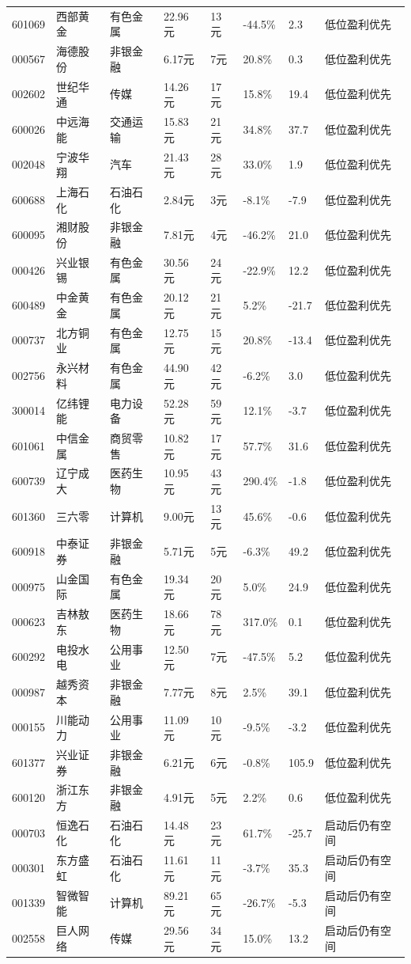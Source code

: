 \begin{longtable}{L{1.05cm}L{1.55cm}L{1.55cm}R{0.85cm}R{0.85cm}R{0.85cm}R{0.85cm}L{2.25cm}}
601069 & 西部黄金 & 有色金属 & 22.96元 & 13元 & -44.5\% & 2.3 & 低位盈利优先 \\
000567 & 海德股份 & 非银金融 & 6.17元 & 7元 & 20.8\% & 0.3 & 低位盈利优先 \\
002602 & 世纪华通 & 传媒 & 14.26元 & 17元 & 15.8\% & 19.4 & 低位盈利优先 \\
600026 & 中远海能 & 交通运输 & 15.83元 & 21元 & 34.8\% & 37.7 & 低位盈利优先 \\
002048 & 宁波华翔 & 汽车 & 21.43元 & 28元 & 33.0\% & 1.9 & 低位盈利优先 \\
600688 & 上海石化 & 石油石化 & 2.84元 & 3元 & -8.1\% & -7.9 & 低位盈利优先 \\
600095 & 湘财股份 & 非银金融 & 7.81元 & 4元 & -46.2\% & 21.0 & 低位盈利优先 \\
000426 & 兴业银锡 & 有色金属 & 30.56元 & 24元 & -22.9\% & 12.2 & 低位盈利优先 \\
600489 & 中金黄金 & 有色金属 & 20.12元 & 21元 & 5.2\% & -21.7 & 低位盈利优先 \\
000737 & 北方铜业 & 有色金属 & 12.75元 & 15元 & 20.8\% & -13.4 & 低位盈利优先 \\
002756 & 永兴材料 & 有色金属 & 44.90元 & 42元 & -6.2\% & 3.0 & 低位盈利优先 \\
300014 & 亿纬锂能 & 电力设备 & 52.28元 & 59元 & 12.1\% & -3.7 & 低位盈利优先 \\
601061 & 中信金属 & 商贸零售 & 10.82元 & 17元 & 57.7\% & 31.6 & 低位盈利优先 \\
600739 & 辽宁成大 & 医药生物 & 10.95元 & 43元 & 290.4\% & -1.8 & 低位盈利优先 \\
601360 & 三六零 & 计算机 & 9.00元 & 13元 & 45.6\% & -0.6 & 低位盈利优先 \\
600918 & 中泰证券 & 非银金融 & 5.71元 & 5元 & -6.3\% & 49.2 & 低位盈利优先 \\
000975 & 山金国际 & 有色金属 & 19.34元 & 20元 & 5.0\% & 24.9 & 低位盈利优先 \\
000623 & 吉林敖东 & 医药生物 & 18.66元 & 78元 & 317.0\% & 0.1 & 低位盈利优先 \\
600292 & 电投水电 & 公用事业 & 12.50元 & 7元 & -47.5\% & 5.2 & 低位盈利优先 \\
000987 & 越秀资本 & 非银金融 & 7.77元 & 8元 & 2.5\% & 39.1 & 低位盈利优先 \\
000155 & 川能动力 & 公用事业 & 11.09元 & 10元 & -9.5\% & -3.2 & 低位盈利优先 \\
601377 & 兴业证券 & 非银金融 & 6.21元 & 6元 & -0.8\% & 105.9 & 低位盈利优先 \\
600120 & 浙江东方 & 非银金融 & 4.91元 & 5元 & 2.2\% & 0.6 & 低位盈利优先 \\
000703 & 恒逸石化 & 石油石化 & 14.48元 & 23元 & 61.7\% & -25.7 & 启动后仍有空间 \\
000301 & 东方盛虹 & 石油石化 & 11.61元 & 11元 & -3.7\% & 35.3 & 启动后仍有空间 \\
001339 & 智微智能 & 计算机 & 89.21元 & 65元 & -26.7\% & -5.3 & 启动后仍有空间 \\
002558 & 巨人网络 & 传媒 & 29.56元 & 34元 & 15.0\% & 13.2 & 启动后仍有空间 \\
\bottomrule
\end{longtable}
